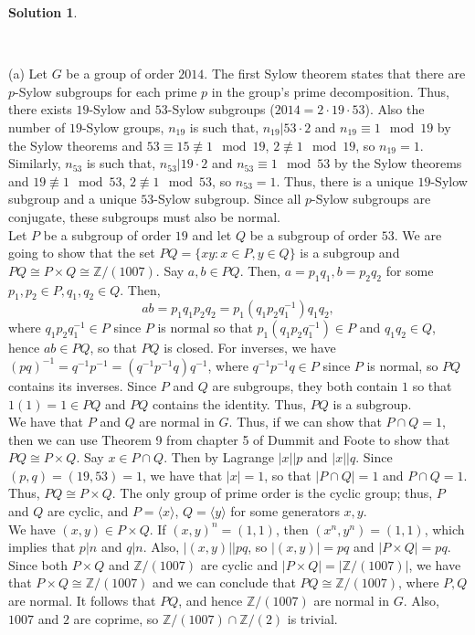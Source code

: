 \documentclass[10pt]{article}
\newcommand{\ZZ}{\mathbb Z}
\theoremstyle{Theorem}
\theoremstyle{definition}
\newtheorem{sol}{Solution}
\theoremstyle{remark}
\theoremstyle{custom}
\begin{document}
\begin{sol}
\begin{description} ~
\item{(a)} Let $G$ be a group of order $2014$. The first Sylow theorem states that there are $p$-Sylow subgroups for each prime $p$ in the group's prime decomposition. Thus, there exists $19$-Sylow and $53$-Sylow subgroups ($2014=2\cdot 19\cdot 53$). Also the number of $19$-Sylow groups, $n_{19}$ is such that, $n_{19}|53\cdot 2$ and $n_{19}\equiv 1\mod 19$ by the Sylow theorems and $53\equiv 15\not\equiv 1\mod 19$, $2\not\equiv 1\mod 19$, so $n_{19}=1$. Similarly,  $n_{53}$ is such that, $n_{53}|19\cdot 2$ and $n_{53}\equiv 1\mod 53$ by the Sylow theorems and $19\not\equiv 1\mod 53$, $2\not\equiv 1\mod 53$, so $n_{53}=1$. Thus, there is a unique $19$-Sylow subgroup and a unique $53$-Sylow subgroup. Since all $p$-Sylow subgroups are conjugate, these subgroups must also be normal. \\
Let $P$ be a subgroup of order $19$ and let $Q$ be a subgroup of order $53$. We are going to show that the set $PQ=\{ xy: x\in P, y\in Q \}$ is a subgroup and $PQ \cong P\times Q \cong \ZZ /(1007)$. Say $a,b\in PQ$. Then, $a=p_1q_1,b=p_2q_2$ for some $p_1,p_2\in P, q_1,q_2\in Q$. Then, 
\[ab=p_1q_1p_2q_2=p_1(q_1p_2q_1^{-1})q_1q_2,  \]
where $q_1p_2q_1^{-1}\in P$ since $P$ is normal so that $ p_1(q_1p_2q_1^{-1})\in P$ and $q_1q_2\in Q$, hence $ab\in PQ$, so that $PQ$ is closed. For inverses, we have $(pq)^{-1}=q^{-1}p^{-1}=(q^{-1}p^{-1}q)q^{-1}$, where $q^{-1}p^{-1}q\in P$ since $P$ is normal, so $PQ$ contains its inverses. Since $P$ and $Q$ are subgroups, they both contain $1$ so that $1(1)=1\in PQ$ and $PQ$ contains the identity. Thus, $PQ$ is a subgroup. \\
We have that $P$ and $Q$ are normal in $G$. Thus, if we can show that $P\cap Q=1$, then we can use Theorem 9 from chapter 5 of Dummit and Foote to show that $PQ\cong P\times Q$. Say $x\in P\cap Q$. Then by Lagrange $|x||p$ and $|x||q$. Since $(p,q)=(19,53)=1$, we have that $|x|=1$, so that $|P\cap Q|=1$ and $P\cap Q=1$. Thus, $PQ\cong P\times Q$. The only group of prime order is the cyclic group; thus, $P$ and $Q$ are cyclic, and $P=\langle x \rangle$, $Q=\langle y \rangle$ for some generators $x,y$. \\
We have $(x,y)\in P\times Q$. If $(x,y)^n=(1,1)$, then $(x^n,y^n)=(1,1)$, which implies that $p|n$ and $q|n$. Also, $|(x,y)||pq$, so $|(x,y)|=pq$ and $|P\times Q |=pq$. Since both $P\times Q$ and $\ZZ/(1007)$ are cyclic and $|P\times Q|=|\ZZ/(1007)|$, we have that $P\times Q\cong \ZZ/(1007)$ and we can conclude that $P Q\cong \ZZ/(1007)$, where $P, Q$ are normal. It follows that $PQ$, and hence $\ZZ/(1007)$ are normal in $G$. Also, $1007$ and $2$ are coprime, so $\ZZ/(1007)\cap \ZZ/(2)$ is trivial. \\

\end{description}
\end{sol}
\end{document}
